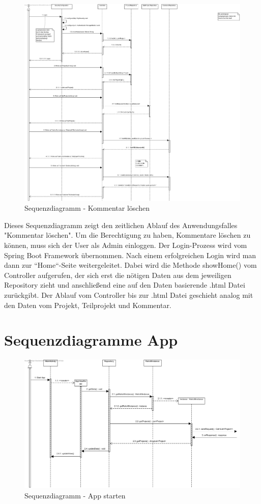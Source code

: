 \begin{figure}[H]
	\centering
	\includegraphics[width=\paperwidth]{img/seqwebdelete}		
	\caption{Sequenzdiagramm - Kommentar löschen}
	\label{fig:sequenz-b}
\end{figure}

Dieses Sequenzdiagramm zeigt den zeitlichen Ablauf des Anwendungsfalles "Kommentar löschen". Um die Berechtigung zu haben, Kommentare löschen zu
können, muss sich der User als Admin einloggen. Der Login-Prozess wird vom Spring Boot Framework übernommen. Nach einem erfolgreichen Login wird
man dann zur ``Home``-Seite weitergeleitet. Dabei wird die Methode showHome() vom Controller aufgerufen, der sich erst die nötigen Daten aus dem
jeweiligen Repository zieht und anschließend eine auf den Daten basierende .html Datei zurückgibt. Der Ablauf vom Controller bis zur .html Datei
geschieht analog mit den Daten vom Projekt, Teilprojekt und Kommentar. 


\section{Sequenzdiagramme App}


\begin{figure}[H]
	\centering
	\includegraphics[width=\textwidth]{img/seqappstart}		
	\caption{Sequenzdiagramm - App starten}
	\label{fig:sequenz-c}
\end{figure}

